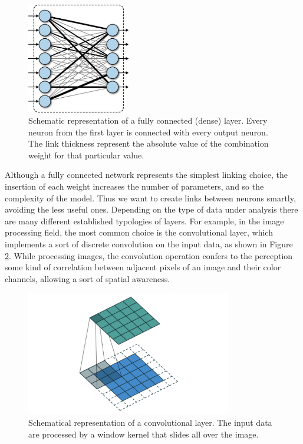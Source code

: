 \begin{figure}
    \centering
    \includegraphics[width = 0.4\textwidth]{images/fully_connected}
    \caption{Schematic representation of a fully connected (dense) layer. Every neuron from the first layer is connected with every output neuron. The link thickness represent the absolute value of the combination weight for that particular value. }
    \label{fig:fully_connected}
\end{figure}

Although a fully connected network represents the simplest linking choice, the insertion of each weight increases the number of parameters, and so the complexity of the model. Thus we want to create links between neurons smartly, avoiding the less useful ones. Depending on the type of data under analysis there are many different established typologies of layers. For example, in the image processing field, the most common choice is the convolutional layer, which implements a sort of discrete convolution on the input data, as shown in Figure \ref{fig:convolutional}. While processing images, the convolution operation confers to the perception some kind of correlation between adjacent pixels of an image and their color channels, allowing a sort of spatial awareness.

\begin{figure}
    \centering
    \includegraphics[width = 0.8\textwidth]{images/CL}
    \caption{Schematical representation of a convolutional layer. The input data are processed by a window kernel that slides all over the image.}
    \label{fig:convolutional}
\end{figure}

